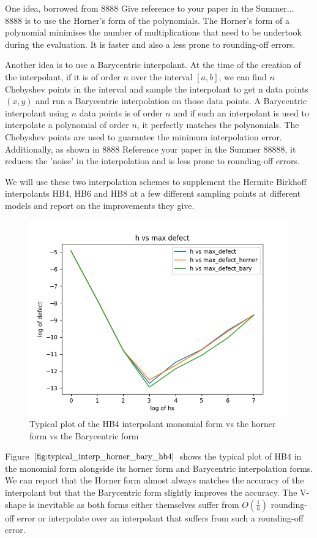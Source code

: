 \documentclass{article}
\begin{document}
One idea, borrowed from 8888 Give reference to your paper in the Summer... 8888 is to use the Horner's form of the polynomials. The Horner's form of a polynomial minimises the number of multiplications that need to be undertook during the evaluation. It is faster and also a less prone to rounding-off errors.

Another idea is to use a Barycentric interpolant. At the time of the creation of the interpolant, if it is of order $n$ over the interval $[a, b]$, we can find $n$ Chebyshev points in the interval and sample the interpolant to get n data points $(x, y)$ and run a Barycentric interpolation on those data points. A Barycentric interpolant using $n$ data points is of order $n$ and if such an interpolant is used to interpolate a polynomial of order $n$, it perfectly matches the polynomials. The Chebyshev points are used to guarantee the minimum interpolation error. Additionally, as shown in 8888 Reference your paper in the Summer 88888, it reduces the 'noise' in the interpolation and is less prone to rounding-off errors.

We will use these two interpolation schemes to supplement the Hermite Birkhoff interpolants HB4, HB6 and HB8 at a few different sampling points at different models and report on the improvements they give.

\begin{figure}[H]
\centering
\includegraphics[width=0.7\linewidth]{./figures/typical_interp_horner_bary_hb4}
\caption{Typical plot of the HB4 interpolant monomial form vs the horner form vs the Barycentric form}
\label{fig:typical_interp_horner_bary_hb4}
\end{figure}

Figure $\ref{fig:typical_interp_horner_bary_hb4}$ shows the typical plot of HB4 in the monomial form alongside its horner form and Barycentric interpolation forms. We can report that the Horner form almost always matches the accuracy of the interpolant but that the Barycentric form slightly improves the accuracy. The V-shape is inevitable as both forms either themselves suffer from $O(\frac{1}{h})$ rounding-off error or interpolate over an interpolant that suffers from such a rounding-off error.
\end{document}
